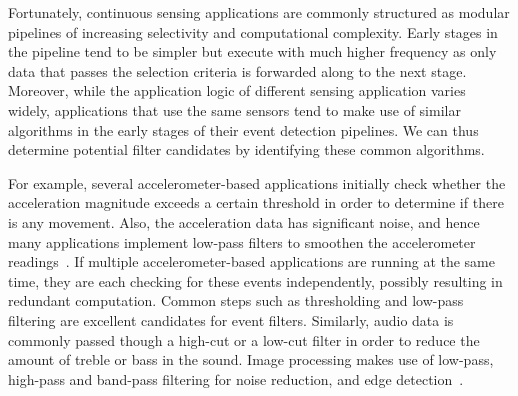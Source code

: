 Fortunately, continuous sensing applications are commonly structured
as modular pipelines of increasing selectivity and computational
complexity.  Early stages in the pipeline tend to be simpler but
execute with much higher frequency as only data that passes the
selection criteria is forwarded along to the next stage.
Moreover, while the application logic of different sensing application
varies widely, applications that use the same sensors tend to make use
of similar algorithms in the early stages of their event detection
pipelines.  We can thus determine potential filter candidates by
identifying these common algorithms.

For example, several accelerometer-based applications initially check
whether the acceleration magnitude exceeds a certain threshold in
order to determine if there is any movement. Also, the acceleration
data has significant noise, and hence many applications implement
low-pass filters to smoothen the accelerometer
readings~\cite{kangasFallDetection,libbyFootstepDetection}.  If
multiple accelerometer-based applications are running at the same
time, they are each checking for these events independently, possibly
resulting in redundant computation. Common steps such as thresholding
and low-pass filtering are excellent candidates for event filters.
Similarly, audio data is commonly passed though a high-cut or a
low-cut filter in order to reduce the amount of treble or bass in the
sound.  Image processing makes use of low-pass, high-pass and
band-pass filtering for noise reduction, and edge
detection~\cite{paul2005computer,marr1980theory}.


